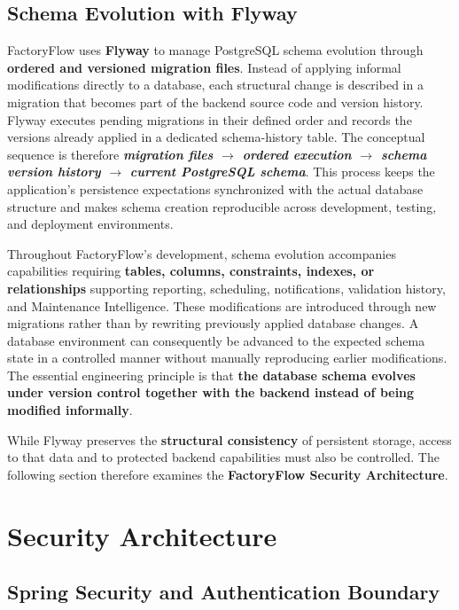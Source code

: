 \subsection{Schema Evolution with Flyway}
\label{subsec:schema-evolution-flyway}

FactoryFlow uses \textbf{Flyway} to manage PostgreSQL schema evolution through \textbf{ordered and versioned migration files}. Instead of applying informal modifications directly to a database, each structural change is described in a migration that becomes part of the backend source code and version history. Flyway executes pending migrations in their defined order and records the versions already applied in a dedicated schema-history table. The conceptual sequence is therefore \textbf{\textit{migration files $\rightarrow$ ordered execution $\rightarrow$ schema version history $\rightarrow$ current PostgreSQL schema}}. This process keeps the application's persistence expectations synchronized with the actual database structure and makes schema creation reproducible across development, testing, and deployment environments.

Throughout FactoryFlow's development, schema evolution accompanies capabilities requiring \textbf{tables, columns, constraints, indexes, or relationships} supporting reporting, scheduling, notifications, validation history, and Maintenance Intelligence. These modifications are introduced through new migrations rather than by rewriting previously applied database changes. A database environment can consequently be advanced to the expected schema state in a controlled manner without manually reproducing earlier modifications. The essential engineering principle is that \textbf{the database schema evolves under version control together with the backend instead of being modified informally}.

While Flyway preserves the \textbf{structural consistency} of persistent storage, access to that data and to protected backend capabilities must also be controlled. The following section therefore examines the \textbf{FactoryFlow Security Architecture}.


\section{Security Architecture}
\subsection{Spring Security and Authentication Boundary}
\label{subsec:security-spring-security}

